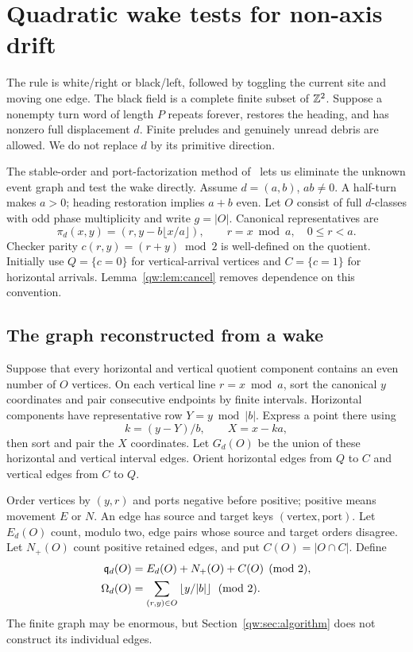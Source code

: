 \section{Quadratic wake tests for non-axis drift}\label{app:quadratic}
The rule is white/right or black/left, followed by toggling the current site
and moving one edge. The black field is a complete finite subset of $\mathbb Z^2$.
Suppose a nonempty turn word of length $P$ repeats forever, restores the heading,
and has nonzero full displacement $d$. Finite preludes and genuinely unread
debris are allowed. We do not replace $d$ by its primitive direction.

The stable-order and port-factorization method of~\cite{Jillhewar2026}
lets us eliminate the unknown event graph and test the wake directly.
Assume $d=(a,b)$, $ab\ne0$. A half-turn makes $a>0$; heading restoration implies
$a+b$ even. Let $O$ consist of full $d$-classes with odd phase multiplicity and
write $g=|O|$. Canonical representatives are
\[
 \pi_d(x,y)=(r,y-b\lfloor x/a\rfloor),\qquad r=x\bmod a,\quad 0\le r<a.
\]
Checker parity $c(r,y)=(r+y)\bmod2$ is well-defined on the quotient. Initially
use $Q=\{c=0\}$ for vertical-arrival vertices and $C=\{c=1\}$ for horizontal
arrivals. Lemma~\ref{qw:lem:cancel} removes dependence on this convention.

\subsection{The graph reconstructed from a wake}
Suppose that every horizontal and vertical quotient component contains an even
number of $O$ vertices. On each vertical line $r=x\bmod a$, sort the canonical
$y$ coordinates and pair consecutive endpoints by finite intervals. Horizontal
components have representative row $Y=y\bmod |b|$. Express a point there using
\[
 k=(y-Y)/b,\qquad X=x-ka,
\]
then sort and pair the $X$ coordinates. Let $G_d(O)$ be the union of these
horizontal and vertical interval edges. Orient horizontal edges from $Q$ to
$C$ and vertical edges from $C$ to $Q$.

Order vertices by $(y,r)$ and ports negative before positive; positive means
movement $E$ or $N$. An edge has source and target keys $(\text{vertex},\text{port})$.
Let $E_d(O)$ count, modulo two, edge pairs whose source and target orders disagree.
Let $N_+(O)$ count positive retained edges, and put $C(O)=|O\cap C|$. Define
\begin{align}
 \mathfrak q_d(O)&=E_d(O)+N_+(O)+C(O)\pmod2,\label{qw:eq:character}\\
 \Omega_d(O)&=\sum_{(r,y)\in O}\left\lfloor y/|b|\right\rfloor\pmod2.
 \label{qw:eq:winding}
\end{align}
The finite graph may be enormous, but Section~\ref{qw:sec:algorithm} does not
construct its individual edges.

